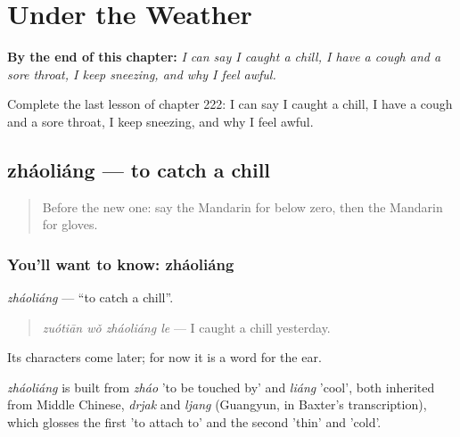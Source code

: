 
\chapter{Under the Weather}
\label{ch:zh-under-the-weather}

\begin{chapteropening}
\textbf{By the end of this chapter:} \emph{I can say I caught a chill, I have a cough and a sore throat, I keep sneezing, and why I feel awful.}

Complete the last lesson of chapter 222: I can say I caught a chill, I have a cough and a sore throat, I keep sneezing, and why I feel awful.
\end{chapteropening}

\section[zháoliáng]{zháoliáng — to catch a chill}

\label{lesson:ZH-C222-zhaoliang}



\begin{quote}
Before the new one: say the Mandarin for below zero, then the Mandarin for gloves.
\end{quote}

\subsection*{You'll want to know: zháoliáng}
\emph{zháoliáng} — \textquotedblleft{}to catch a chill\textquotedblright{}.

\begin{quote}
\emph{zuótiān wǒ zháoliáng le} — I caught a chill yesterday.
\end{quote}

Its characters come later; for now it is a word for the ear.

\begin{cousinweb}
\emph{zháoliáng} is built from \emph{zháo} 'to be touched by' and \emph{liáng} 'cool', both inherited from Middle Chinese, \emph{drjak} and \emph{ljang} (Guangyun, in Baxter's transcription), which glosses the first 'to attach to' and the second 'thin' and 'cold'.
\end{cousinweb}

